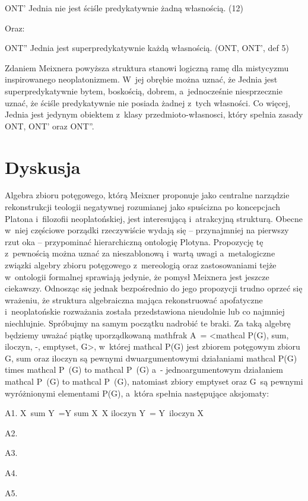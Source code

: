 ONT' Jednia nie jest ściśle predykatywnie żadną własnością. (12)

Oraz:

ONT'' Jednia jest superpredykatywnie każdą własnością. (ONT, ONT', def 5)

Zdaniem Meixnera powyższa struktura stanowi logiczną ramę dla mistycyzmu inspirowanego neoplatonizmem. W~jej obrębie można uznać, że Jednia jest superpredykatywnie bytem, boskością, dobrem, a~jednocześnie niesprzecznie uznać, że ściśle predykatywnie nie posiada żadnej z~tych własności. Co więcej, Jednia jest jedynym obiektem z~klasy przedmioto-własnosci, który spełnia zasady ONT, ONT' oraz ONT''.

\section{Dyskusja}

Algebra zbioru potęgowego, którą Meixner proponuje jako centralne narządzie rekonstrukcji teologii negatywnej rozumianej jako spuścizna po koncepcjach Platona i~filozofii neoplatońskiej, jest interesującą i~atrakcyjną strukturą. Obecne w~niej częściowe porządki rzeczywiście wydają się -- przynajmniej na pierwszy rzut oka -- przypominać hierarchiczną ontologię Plotyna. Propozycję tę z~pewnością można uznać za nieszablonową i~wartą uwagi a~metalogiczne związki algebry zbioru potęgowego z~mereologią oraz zastosowaniami tejże w~ontologii formalnej sprawiają jedynie, że pomysł Meixnera jest jeszcze ciekawszy. Odnosząc się jednak bezpośrednio do jego propozycji trudno oprzeć się wrażeniu, że struktura algebraiczna mająca rekonstruować apofatyczne i~neoplatońskie rozważania została przedstawiona nieudolnie lub co najmniej niechlujnie. Spróbujmy na samym początku nadrobić te braki. Za taką algebrę będziemy uważać piątkę uporządkowaną mathfrak A~= {\textless}mathcal P(G), sum, iloczyn, -, emptyset, G{\textgreater}, w~której mathcal P(G) jest zbiorem potęgowym zbioru G, sum oraz iloczyn są pewnymi dwuargumentowymi działaniami mathcal P(G) times mathcal P~(G) to mathcal P~(G) a~- jednoargumentowym działaniem mathcal P~(G) to mathcal P~(G), natomiast zbiory emptyset oraz G~są pewnymi wyróżnionymi elementami P(G), a~która spełnia następujące aksjomaty:

A1. X~sum Y~=Y sum X~X iloczyn Y~= Y~iloczyn X

A2.

A3.

A4.

A5.

